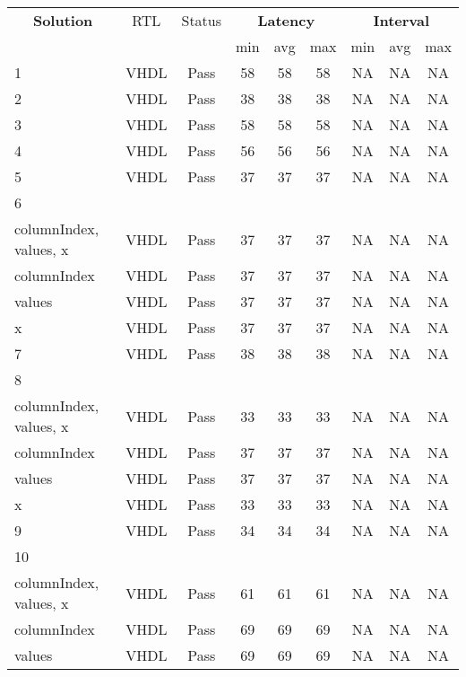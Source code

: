 

\begin{table}[H]
	\centering
	\begin{tabular}{|l|c|c|c|c|c|c|c|c|}
		\hline
		\multicolumn{1}{|c|}{\textbf{Solution}} & \multicolumn{1}{|c|}{RTL} & \multicolumn{1}{|c|}{Status} & \multicolumn{3}{c|}{\textbf{Latency}} & \multicolumn{3}{c|}{\textbf{Interval}} \\
		& &  & min & avg & max & min & avg & max \\
		\hline
		1 & VHDL & Pass & 58 & 58 & 58 & NA & NA & NA \\
		\hline
		2 & VHDL & Pass & 38 & 38 & 38 & NA & NA & NA \\
		\hline
		3 & VHDL & Pass & 58 & 58 & 58 & NA & NA & NA \\
		\hline
		4 & VHDL & Pass & 56 & 56 & 56 & NA & NA & NA \\
		\hline
		5 & VHDL & Pass & 37 & 37 & 37 & NA & NA & NA \\
		\hline
		6 &  &  &  &  &  &  &  &  \\
		\tabitem columnIndex, values, x & VHDL & Pass & 37 & 37 & 37 & NA & NA & NA \\
		\tabitem columnIndex & VHDL & Pass & 37 & 37 & 37 & NA & NA & NA \\
		\tabitem values & VHDL & Pass & 37 & 37 & 37 & NA & NA & NA \\
		\tabitem x & VHDL & Pass & 37 & 37 & 37 & NA & NA & NA \\
		\hline
		7 & VHDL & Pass & 38 & 38 & 38 & NA & NA & NA \\
		\hline
		8 &  &  &  &  &  &  &  &  \\
		\tabitem columnIndex, values, x & VHDL & Pass & 33 & 33 & 33 & NA & NA & NA \\
		\tabitem columnIndex & VHDL & Pass & 37 & 37 & 37 & NA & NA & NA \\
		\tabitem values & VHDL & Pass & 37 & 37 & 37 & NA & NA & NA \\
		\tabitem x & VHDL & Pass & 33 & 33 & 33 & NA & NA & NA \\
		\hline
		9 & VHDL & Pass & 34 & 34 & 34 & NA & NA & NA \\
		\hline
		10 &  &  &  &  &  &  &  &  \\
		\tabitem columnIndex, values, x & VHDL & Pass & 61 & 61 & 61 & NA & NA & NA \\
		\tabitem columnIndex & VHDL & Pass & 69 & 69 & 69 & NA & NA & NA \\
		\tabitem values & VHDL & Pass & 69 & 69 & 69 & NA & NA & NA \\

\end{tabular}
\end{table}
